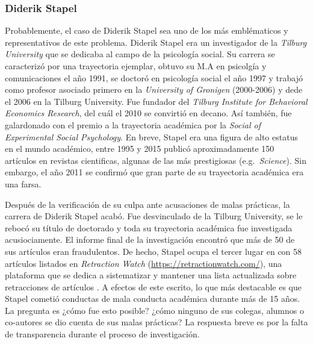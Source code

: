 \documentclass[
]{book}
\begin{document}
\hypertarget{diderik-stapel}{%
\subsubsection{Diderik Stapel}\label{diderik-stapel}}

Probablemente, el caso de Diderik Stapel sea uno de los más emblématicos y representativos de este problema. Diderik Stapel era un investigador de la \emph{Tilburg University} que se dedicaba al campo de la psicología social. Su carrera se caracterizó por una trayectoria ejemplar, obtuvo su M.A en psicolgía y comunicaciones el año 1991, se doctoró en psicología social el año 1997 y trabajó como profesor asociado primero en la \emph{University of Gronigen} (2000-2006) y dede el 2006 en la Tilburg University. Fue fundador del \emph{Tilburg Institute for Behavioral Economics Research}, del cuál el 2010 se convirtió en decano. Así también, fue galardonado con el premio a la trayectoria académica por la \emph{Social of Experimental Social Psychology}. En breve, Stapel era una figura de alto estatus en el mundo académico, entre 1995 y 2015 publicó aproximadamente 150 artículos en revistas cientificas, algunas de las más prestigiosas (e.g.~\emph{Science}). Sin embargo, el año 2011 se confirmó que gran parte de su trayectoria académica era una farsa.

Después de la verificación de su culpa ante acusaciones de malas prácticas, la carrera de Diderik Stapel acabó. Fue desvinculado de la Tilburg University, se le rebocó su título de doctorado y toda su trayectoria académica fue investigada acusiociamente. El informe final de la investigación encontró que más de 50 de sus artículos eran fraudulentos. De hecho, Stapel ocupa el tercer lugar en con 58 artículos listados en \emph{Retraction Watch} (\url{https://retractionwatch.com/}), una plataforma que se dedica a sistematizar y mantener una lista actualizada sobre retracciones de artículos . A efectos de este escrito, lo que más destacable es que Stapel cometió conductas de mala conducta académica durante más de 15 años. La pregunta es ¿cómo fue esto posible? ¿cómo ninguno de sus colegas, alumnos o co-autores se dio cuenta de sus malas prácticas? La respuesta breve es por la falta de transparencia durante el proceso de investigación.
\end{document}
